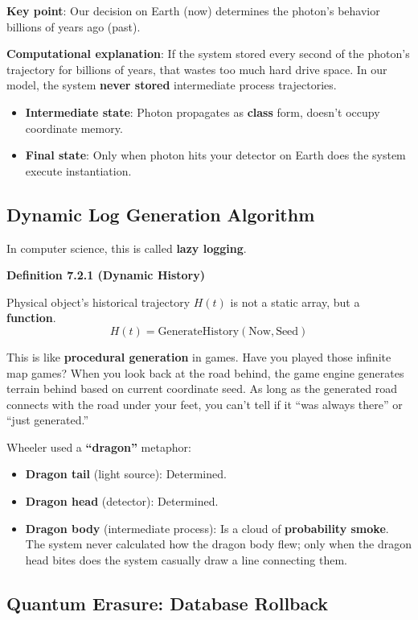 \textbf{Key point}: Our decision on Earth (now) determines the photon's behavior billions of years ago (past).

\textbf{Computational explanation}:
If the system stored every second of the photon's trajectory for billions of years, that wastes too much hard drive space.
In our model, the system \textbf{never stored} intermediate process trajectories.
\begin{itemize}
\item \textbf{Intermediate state}: Photon propagates as \textbf{class} form, doesn't occupy coordinate memory.
\item \textbf{Final state}: Only when photon hits your detector on Earth does the system execute instantiation.
\end{itemize}

\subsection{Dynamic Log Generation Algorithm}

In computer science, this is called \textbf{lazy logging}.

\textbf{Definition 7.2.1 (Dynamic History)}

Physical object's historical trajectory $H(t)$ is not a static array, but a \textbf{function}.
\[
H(t) = \text{GenerateHistory}(\text{Now}, \text{Seed})
\]

This is like \textbf{procedural generation} in games.
Have you played those infinite map games? When you look back at the road behind, the game engine generates terrain behind based on current coordinate seed. As long as the generated road connects with the road under your feet, you can't tell if it ``was always there'' or ``just generated.''

Wheeler used a \textbf{``dragon''} metaphor:
\begin{itemize}
\item \textbf{Dragon tail} (light source): Determined.
\item \textbf{Dragon head} (detector): Determined.
\item \textbf{Dragon body} (intermediate process): Is a cloud of \textbf{probability smoke}. The system never calculated how the dragon body flew; only when the dragon head bites does the system casually draw a line connecting them.
\end{itemize}

\subsection{Quantum Erasure: Database Rollback}

